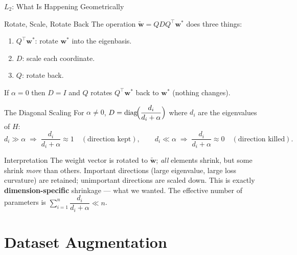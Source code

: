 \documentclass{beamer}
\begin{document}
\begin{frame}[shrink=10]{$L_2$: What Is Happening Geometrically}
  \begin{block}{Rotate, Scale, Rotate Back}
    The operation $\tilde{\mathbf{w}} = QDQ^{\top}\mathbf{w}^{*}$ does three
    things:
    \begin{enumerate}\setlength\itemsep{2pt}
      \item $Q^{\top}\mathbf{w}^{*}$: rotate $\mathbf{w}^{*}$ into the
            eigenbasis.
      \item $D$: scale each coordinate.
      \item $Q$: rotate back.
    \end{enumerate}
    If $\alpha=0$ then $D=I$ and $Q$ rotates $Q^{\top}\mathbf{w}^{*}$ back to
    $\mathbf{w}^{*}$ (nothing changes).
  \end{block}

  \begin{block}{The Diagonal Scaling}
    For $\alpha\neq 0$, $D = \mathrm{diag}\!\Bigl(\dfrac{d_i}{d_i+\alpha}\Bigr)$
    where $d_i$ are the eigenvalues of $H$:
    \[
      d_i \gg \alpha \;\Rightarrow\; \frac{d_i}{d_i+\alpha}\approx 1
      \quad(\text{direction kept}),\qquad
      d_i \ll \alpha \;\Rightarrow\; \frac{d_i}{d_i+\alpha}\approx 0
      \quad(\text{direction killed}).
    \]
  \end{block}

  \begin{alertblock}{Interpretation}
    The weight vector is rotated to $\tilde{\mathbf{w}}$; \emph{all}
    elements shrink, but some shrink \emph{more} than others. Important
    directions (large eigenvalue, large loss curvature) are retained;
    unimportant directions are scaled down. This is exactly
    \textbf{dimension-specific} shrinkage --- what we wanted. The effective
    number of parameters is $\sum_{i=1}^{n}\dfrac{d_i}{d_i+\alpha} \ll n$.
  \end{alertblock}
\end{frame}

\section{Dataset Augmentation}
\end{document}
